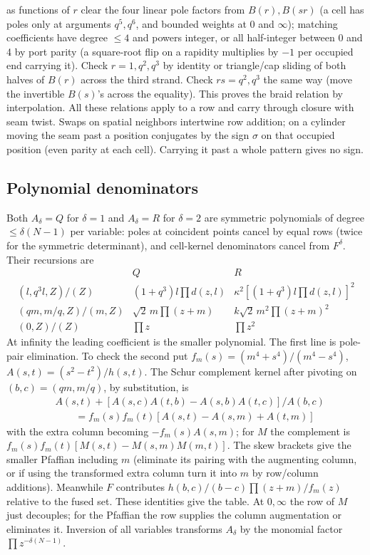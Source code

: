 \documentclass[11pt]{article}
\numberwithin{equation}{section}
\theoremstyle{definition}\newtheorem{definition}[theorem]{Definition}
\theoremstyle{remark}\newtheorem{remark}[theorem]{Remark}
\begin{document}
as functions of \(r\) clear the four linear pole factors from \(B(r),B(sr)\) (a cell has poles only at arguments \(q^5,q^6\), and bounded weights at 0 and \(\infty\)); matching coefficients have degree \(\le4\) and powers integer, or all half-integer between 0 and 4 by port parity (a square-root flip on a rapidity multiplies by \(-1\) per occupied end carrying it). Check \(r=1,q^2,q^3\) by identity or triangle/cap sliding of both halves of \(B(r)\) across the third strand. Check \(rs=q^2,q^3\) the same way (move the invertible \(B(s)\)'s across the equality). This proves the braid relation by interpolation. All these relations apply to a row and carry through closure with seam twist. Swaps on spatial neighbors intertwine row addition; on a cylinder moving the seam past a position conjugates by the sign \(\sigma\) on that occupied position (even parity at each cell). Carrying it past a whole pattern gives no sign.

\subsection{Polynomial denominators}\label{L:step2}

Both \(A_\delta=Q\) for \(\delta=1\) and \(A_\delta=R\) for \(\delta=2\) are symmetric polynomials of degree \(\le\delta(N-1)\) per variable: poles at coincident points cancel by equal rows (twice for the symmetric determinant), and cell-kernel denominators cancel from \(F^\delta\). Their recursions are
\begin{equation}\label{L:eq:polynomial-reductions}
\begin{array}{l|l|l}
 &Q&R\\ \hline
 (l,q^3 l,Z)/ (Z) &(1+q^3)l\prod d(z,l)
 &\kappa^2[(1+q^3)l\prod d(z,l)]^2\\
 (qm,m/q,Z)/(m,Z)&\sqrt2\,m\prod(z+m)&k\sqrt2\,m^2\prod(z+m)^2\\
 (0,Z)/(Z)&\prod z &\prod z^2
\end{array}
\end{equation}
At infinity the leading coefficient is the smaller polynomial. The first line is pole-pair elimination. To check the second put \(f_m(s)=(m^4+s^4)/(m^4-s^4)\), \(A(s,t)=(s^2-t^2)/h(s,t)\). The Schur complement kernel after pivoting on \((b,c)=(q m,m/q)\), by substitution, is
\[
 \begin{aligned}
 &A(s,t)+[A(s,c)A(t,b)-A(s,b)A(t,c)]/A(b,c)\\
 &\qquad=f_m(s)f_m(t)[A(s,t)-A(s,m)+A(t,m)]
 \end{aligned}
\]
with the extra column becoming \(-f_m(s) A(s,m)\); for \(M\) the complement is \(f_m(s) f_m(t)[M(s,t)-M(s,m)M(m,t)]\). The skew brackets give the smaller Pfaffian including \(m\) (eliminate its pairing with the augmenting column, or if using the transformed extra column turn it into \(m\) by row/column additions). Meanwhile \(F\) contributes \(h(b,c)/(b-c)\prod(z+m)/f_m(z)\) relative to the fused set. These identities give the table. At \(0,\infty\) the row of \(M\) just decouples; for the Pfaffian the row supplies the column augmentation or eliminates it. Inversion of all variables transforms \(A_\delta\) by the monomial factor \(\prod z^{-\delta(N-1)}\).
\end{document}
